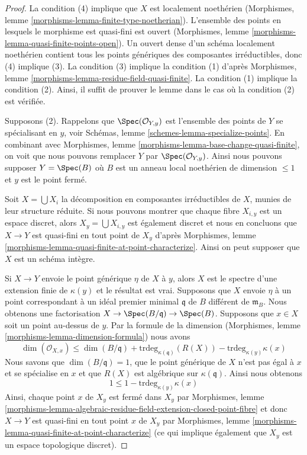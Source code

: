\begin{proof}
La condition (4) implique que $X$ est localement noethérien
(Morphismes, lemme \ref{morphisms-lemma-finite-type-noetherian}).
L'ensemble des points en lesquels le morphisme est quasi-fini est
ouvert (Morphismes, lemme
\ref{morphisms-lemma-quasi-finite-points-open}). Un ouvert dense d'un
schéma localement noethérien contient tous les points génériques des
composantes irréductibles, donc (4) implique (3). La condition (3)
implique la condition (1) d'après Morphismes, lemme
\ref{morphisms-lemma-residue-field-quasi-finite}. La condition (1) implique la condition
(2). Ainsi, il suffit de prouver le lemme dans le cas où la condition (2) est vérifiée.

\medskip\noindent
Supposons (2). Rappelons que
$\Spec(\mathcal{O}_{Y, y})$ est l'ensemble des points de $Y$
se spécialisant en $y$, voir Schémas, lemme
\ref{schemes-lemma-specialize-points}. En combinant avec Morphismes,
lemme \ref{morphisms-lemma-base-change-quasi-finite}, on voit
que nous pouvons remplacer $Y$ par $\Spec(\mathcal{O}_{Y, y})$.
Ainsi nous pouvons supposer $Y = \Spec(B)$ où $B$ est un anneau
local noethérien de dimension $\leq 1$ et $y$ est le point fermé.

\medskip\noindent
Soit $X = \bigcup X_i$ la décomposition en composantes irréductibles
de $X$, munies de leur structure réduite. Si nous pouvons
montrer que chaque fibre $X_{i, y}$ est un espace discret, alors
$X_y = \bigcup X_{i, y}$ est également discret et nous en concluons
que $X \to Y$ est quasi-fini en tout point de $X_y$ d'après
Morphismes, lemme
\ref{morphisms-lemma-quasi-finite-at-point-characterize}. Ainsi on peut supposer que $X$ est un schéma intègre.

\medskip\noindent
Si $X \to Y$ envoie le point générique $\eta$ de $X$ à
$y$, alors $X$ est le spectre d'une extension finie de
$\kappa(y)$ et le résultat est vrai. Supposons que $X$
envoie $\eta$ à un point correspondant à un idéal premier
minimal $\mathfrak q$ de $B$ différent de $\mathfrak m_B$.
Nous obtenons une factorisation $X \to \Spec(B/\mathfrak
q) \to \Spec(B)$. Supposons que $x \in X$ soit un point
au-dessus de $y$. Par la formule de la dimension
(Morphismes, lemme \ref{morphisms-lemma-dimension-formula}) nous avons
$$
\dim(\mathcal{O}_{X, x}) \leq \dim(B/\mathfrak q) +
\text{trdeg}_{\kappa(\mathfrak q)}(R(X)) - \text{trdeg}_{\kappa(y)} \kappa(x)
$$
Nous savons que $\dim(B/\mathfrak q) = 1$, que le point
générique de $X$ n'est pas égal à $x$ et se spécialise en $x$ et que
$R(X)$ est algébrique sur $\kappa(\mathfrak q)$. Ainsi nous obtenons
$$
1 \leq 1 - \text{trdeg}_{\kappa(y)} \kappa(x)
$$
Ainsi, chaque point $x$ de $X_y$ est fermé dans $X_y$ par
Morphismes, lemme
\ref{morphisms-lemma-algebraic-residue-field-extension-closed-point-fibre}
et donc $X \to Y$ est quasi-fini en tout point $x$ de $X_y$ par
Morphismes, lemme
\ref{morphisms-lemma-quasi-finite-at-point-characterize} (ce qui implique également que $X_y$ est un espace topologique discret).
\end{proof}


